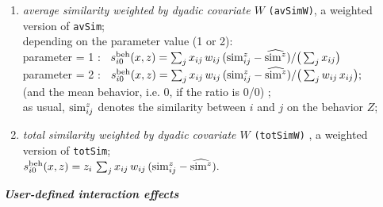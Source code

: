 \documentclass[a4paper,fleqn,11pt]{article}
\newcommand{\+}{\, + \,}
\newcommand{\vit}{\theenumi}
\newcounter{savenumi}
\begin{document}
\begin{enumerate}
 \item {\em average similarity weighted by dyadic covariate $W$}
                       \texttt{(avSimW)},
                       a weighted version of  \texttt{avSim};\\
                       depending on the parameter value (1 or 2):\\
  parameter = 1 : \ $s^{\rm beh}_{i\vit}(x, z) =
                      \sum_j x_{ij} \, w_{ij} \,({\rm sim}^z_{ij} - \widehat{{\rm sim}^z})  /
                                        \big (\sum_j x_{ij}\big)$\\
   parameter = 2 : \  $s^{\rm beh}_{i\vit}(x, z) =
                  \sum_j x_{ij} \, w_{ij} \,({\rm sim}^z_{ij} - \widehat{{\rm sim}^z}) /
                                \big (\sum_j w_{ij} \,x_{ij}\big) ;$\\
 (and the mean behavior, i.e. $0$, if the ratio is 0/0) ;\\
   as usual, ${\rm sim}^z_{ij}$ denotes the similarity between $i$ and $j$
   on the behavior $Z$;
 \item {\em total similarity weighted by dyadic covariate $W$}
                       \texttt{(totSimW)} ,
                       a weighted version of  \texttt{totSim}; \\
   $s^{\rm beh}_{i\vit}(x, z) =  z_i \, \sum_j x_{ij} \, w_{ij} \, ({\rm sim}^z_{ij} - \widehat{{\rm sim}^z})  .$
\setcounter{savenumi}{\value{enumi}}
\end{enumerate}



\medskip

\noindent
\textbf{\emph{User-defined interaction effects}}
\medskip

\noindent
\end{document}
